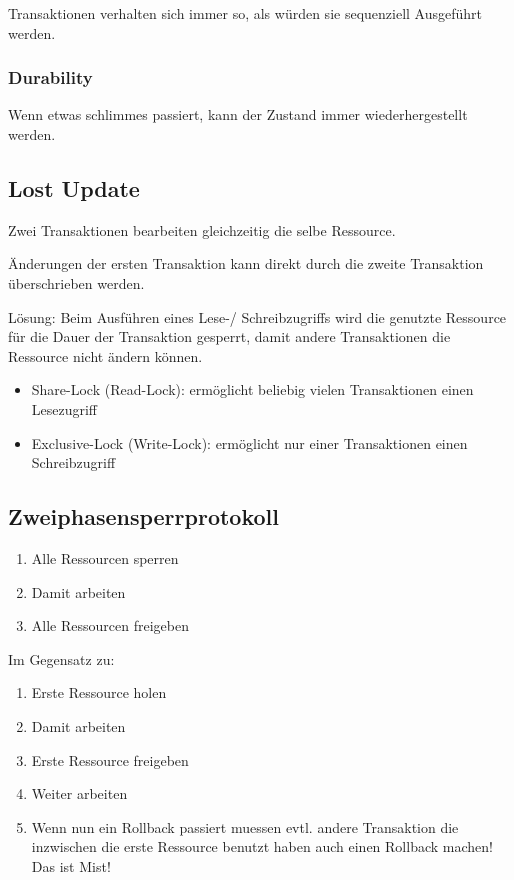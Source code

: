 \documentclass[10pt,a4paper,oneside]{report}
\begin{document}
Transaktionen verhalten sich immer so, als würden sie sequenziell Ausgeführt werden.

\subsubsection*{Durability}

Wenn etwas schlimmes passiert, kann der Zustand immer wiederhergestellt werden.

\subsection*{Lost Update}

Zwei Transaktionen bearbeiten gleichzeitig die selbe Ressource.

Änderungen der ersten Transaktion kann direkt durch die zweite Transaktion überschrieben werden.

Lösung: Beim Ausführen eines Lese-/ Schreibzugriffs wird die genutzte Ressource für die Dauer der Transaktion gesperrt, damit andere Transaktionen die Ressource nicht ändern können.
\begin{itemize}
\item Share-Lock (Read-Lock): ermöglicht beliebig vielen Transaktionen einen Lesezugriff
\item Exclusive-Lock (Write-Lock): ermöglicht nur einer Transaktionen einen Schreibzugriff
\end{itemize}

\subsection*{Zweiphasensperrprotokoll}

\begin{enumerate}
\item Alle Ressourcen sperren
\item Damit arbeiten
\item Alle Ressourcen freigeben
\end{enumerate}

Im Gegensatz zu:

\begin{enumerate}
\item Erste Ressource holen
\item Damit arbeiten
\item Erste Ressource freigeben
\item Weiter arbeiten
\item Wenn nun ein Rollback passiert muessen evtl. andere Transaktion die inzwischen die erste Ressource benutzt haben auch einen Rollback machen! Das ist Mist!
\end{enumerate}
\end{document}
